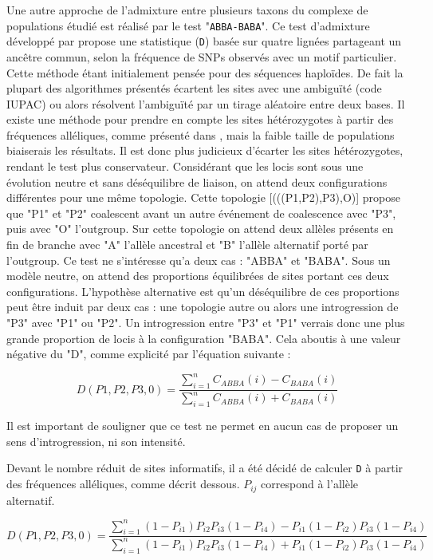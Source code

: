 Une autre approche de l'admixture entre plusieurs taxons du complexe de populations étudié est réalisé par le test "\verb|ABBA-BABA|". 
Ce test d'admixture développé par \citet{Durand2011} propose une statistique (\verb|D|) basée sur quatre lignées partageant un ancêtre commun, selon la fréquence de SNPs observés avec un motif particulier.
Cette méthode étant initialement pensée pour des séquences haploïdes. 
De fait la plupart des algorithmes présentés écartent les sites avec une ambiguïté (code IUPAC) ou alors résolvent l’ambiguïté par un tirage aléatoire entre deux bases.
Il existe une méthode pour prendre en compte les sites hétérozygotes à partir des fréquences alléliques, comme présenté dans \citet{Durand2011}, mais la faible taille de populations biaiserais les résultats. Il est donc plus judicieux d'écarter les sites hétérozygotes, rendant le test plus conservateur.
Considérant que les locis sont sous une évolution neutre et sans déséquilibre de liaison, on attend deux configurations différentes pour une même topologie. 
Cette topologie [(((P1,P2),P3),O)] propose que "P1" et "P2" coalescent avant un autre événement de coalescence avec "P3", puis avec "O" l'outgroup.
Sur cette topologie on attend deux allèles présents en fin de branche avec "A" l'allèle ancestral et "B" l'allèle alternatif porté par l'outgroup.
Ce test ne s'intéresse qu'a deux cas : "ABBA" et "BABA".
Sous un modèle neutre, on attend des proportions équilibrées de sites portant ces deux configurations.
L'hypothèse alternative est qu'un déséquilibre de ces proportions peut être induit par deux cas : une topologie autre ou alors une introgression de "P3" avec "P1" ou "P2".
Un introgression entre "P3" et "P1" verrais donc une plus grande proportion de locis à la configuration "BABA". 
Cela aboutis à une valeur négative du "D", comme explicité par l'équation suivante :

\[D(P1,P2,P3,0)=\frac{\sum_{i=1}^{n} C_{ABBA}(i)-C_{BABA}(i)}{\sum_{i=1}^{n} C_{ABBA}(i)+C_{BABA}(i)}\]

Il est important de souligner que ce test ne permet en aucun cas de proposer un sens d'introgression, ni son intensité.

Devant le nombre réduit de sites informatifs, il a été décidé de calculer \verb|D| à partir des fréquences alléliques, comme décrit dessous. 
\textit{$P_{ij}$} correspond à l'allèle alternatif.

\[D(P1,P2,P3,0)=\frac{\sum_{i=1}^{n} (1-P_{i1})P_{i2}P_{i3}(1-P_{i4})-P_{i1}(1-P_{i2})P_{i3}(1-P_{i4})}{\sum_{i=1}^{n} (1-P_{i1})P_{i2}P_{i3}(1-P_{i4})+P_{i1}(1-P_{i2})P_{i3}(1-P_{i4})}\]


